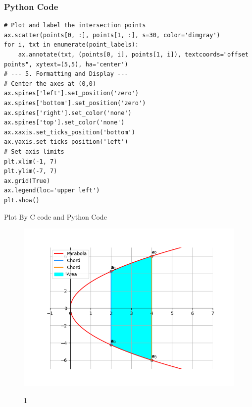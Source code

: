 \documentclass{beamer}
\begin{document}
\begin{frame}[fragile]
\frametitle{Python Code}
\begin{lstlisting}
# Plot and label the intersection points
ax.scatter(points[0, :], points[1, :], s=30, color='dimgray')
for i, txt in enumerate(point_labels):
    ax.annotate(txt, (points[0, i], points[1, i]), textcoords="offset points", xytext=(5,5), ha='center')
# --- 5. Formatting and Display ---
# Center the axes at (0,0)
ax.spines['left'].set_position('zero')
ax.spines['bottom'].set_position('zero')
ax.spines['right'].set_color('none')
ax.spines['top'].set_color('none')
ax.xaxis.set_ticks_position('bottom')
ax.yaxis.set_ticks_position('left')
# Set axis limits
plt.xlim(-1, 7)
plt.ylim(-7, 7)
ax.grid(True)
ax.legend(loc='upper left')
plt.show()

\end{lstlisting}
\end{frame}
\begin{frame}{Plot By C code and Python Code}
    \begin{figure}
    \centering
    \includegraphics[width=0.7\columnwidth]{figs/Figure_1.png}
    \label{fig:placeholder}
    \caption{1}
\end{figure}
\end{frame}
\end{document}
